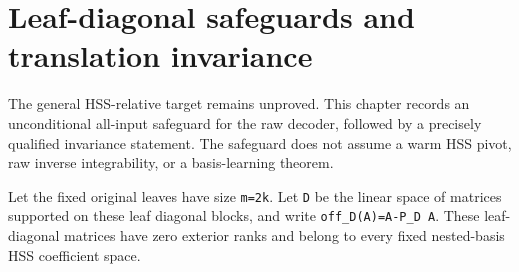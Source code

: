 \documentclass[11pt,oneside,openany,a4paper]{book}
\numberwithin{equation}{chapter}
\theoremstyle{definition}
\theoremstyle{remark}
\newcommand{\proofstep}[1]{\par\addvspace{.45\baselineskip}\Needspace{3\baselineskip}\textbf{#1}\par\nobreak}
\newcommand{\R}{\mathbb R}\newcommand{\E}{\mathbb E}\newcommand{\Prb}{\mathbb P}\newcommand{\PP}{\mathbb P}
\newcommand{\T}{\mathsf T}\newcommand{\Id}{I}
\newcommand{\F}[1]{\left\lVert#1\right\rVert_F}
\newcommand{\N}[1]{\left\lVert#1\right\rVert}
\newcommand{\op}[1]{\left\lVert#1\right\rVert_{\rm op}}
\newcommand{\ip}[2]{\left\langle#1,#2\right\rangle_F}
\DeclareMathOperator{\tr}{tr}\DeclareMathOperator{\rank}{rank}
\DeclareMathOperator{\diag}{blockdiag}\DeclareMathOperator{\range}{range}
\DeclareMathOperator{\HSS}{HSS}\DeclareMathOperator{\dist}{dist}
\DeclareMathOperator{\Var}{Var}\DeclareMathOperator{\supp}{supp}
\newcommand{\UC}{\mathcal U}\newcommand{\VC}{\mathcal V}\newcommand{\err}{\mathcal E}
\newcommand{\Sn}[2]{\left\lVert#1\right\rVert_{S_{#2}}}
\newcommand{\Cov}{\mathsf C}\newcommand{\Loss}{\mathsf L}\newcommand{\Fil}{\mathcal F}
\DeclareMathOperator{\diver}{div}\DeclareMathOperator{\vecop}{vec}\DeclareMathOperator{\Gammafun}{Gamma}
\begin{document}
\endgroup

\begingroup
\let\R\relax
\newcommand{\R}{\mathbb R}
\let\E\relax
\newcommand{\E}{\mathbb E}
\let\Prb\relax
\newcommand{\Prb}{\mathbb P}
\let\T\relax
\newcommand{\T}{\mathsf T}
\let\F\relax
\newcommand{\F}[1]{\left\lVert#1\right\rVert_{F}}
\let\N\relax
\newcommand{\N}[1]{\left\lVert#1\right\rVert}
\let\ip\relax
\newcommand{\ip}[2]{\left\langle#1,#2\right\rangle_F}
\let\tr\relax
\newcommand{\tr}{\operatorname{tr}}
\let\rank\relax
\newcommand{\rank}{\operatorname{rank}}
\let\diag\relax
\newcommand{\diag}{\operatorname{blockdiag}}
\let\range\relax
\newcommand{\range}{\operatorname{range}}
\let\OPT\relax
\newcommand{\OPT}{\operatorname{OPT}}
\let\HSS\relax
\newcommand{\HSS}{\operatorname{HSS}}
\let\diver\relax
\newcommand{\diver}{\operatorname{div}}
\let\Var\relax
\newcommand{\Var}{\operatorname{Var}}
\let\UC\relax
\newcommand{\UC}{\mathcal U}
\let\VC\relax
\newcommand{\VC}{\mathcal V}
\let\err\relax
\newcommand{\err}{\mathcal E}
\let\proofstep\relax
\newcommand{\proofstep}[1]{\par\addvspace{.45\baselineskip}\Needspace{3\baselineskip}\textbf{#1}\par\nobreak}
\let\op\relax
\newcommand{\op}[1]{\left\lVert#1\right\rVert_{\mathrm{op}}}
\let\Sn\relax
\newcommand{\Sn}[2]{\left\lVert#1\right\rVert_{S_{#2}}}
\let\Cov\relax
\newcommand{\Cov}{\mathsf C}
\let\Loss\relax
\newcommand{\Loss}{\mathsf L}
\let\Fil\relax
\newcommand{\Fil}{\mathcal F}
\let\Id\relax
\newcommand{\Id}{I}
\let\supp\relax
\newcommand{\supp}{\operatorname{supp}}
\let\vecop\relax
\newcommand{\vecop}{\operatorname{vec}}
\let\Gammafun\relax
\newcommand{\Gammafun}{\operatorname{Gamma}}
\chapter{Leaf-diagonal safeguards and translation invariance}\label{ch:fallback}
The general HSS-relative target remains unproved. This chapter records an unconditional all-input safeguard for the raw decoder, followed by a precisely qualified invariance statement. The safeguard does not assume a warm HSS pivot, raw inverse integrability, or a basis-learning theorem.

Let the fixed original leaves have size \texttt{m=2k}. Let \texttt{D} be the linear space of matrices supported on these leaf diagonal blocks, and write \texttt{off\_D(A)=A-P\_D\ A}. These leaf-diagonal matrices have zero exterior ranks and belong to every fixed nested-basis HSS coefficient space.
\end{document}
